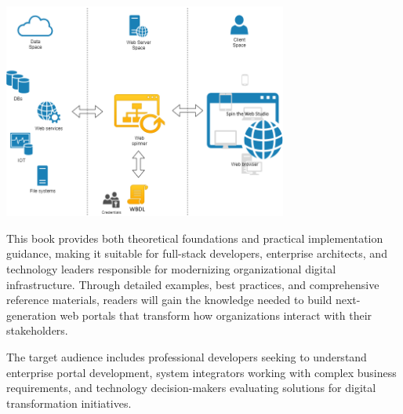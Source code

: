 \begin{center}
\includegraphics[width=0.7\textwidth]{figures/spin-the-web.png}\\[0.5cm]
\end{center}

This book provides both theoretical foundations and practical implementation guidance, making it suitable for full-stack developers, enterprise architects, and technology leaders responsible for modernizing organizational digital infrastructure. Through detailed examples, best practices, and comprehensive reference materials, readers will gain the knowledge needed to build next-generation web portals that transform how organizations interact with their stakeholders.

The target audience includes professional developers seeking to understand enterprise portal development, system integrators working with complex business requirements, and technology decision-makers evaluating solutions for digital transformation initiatives.

\clearpage
